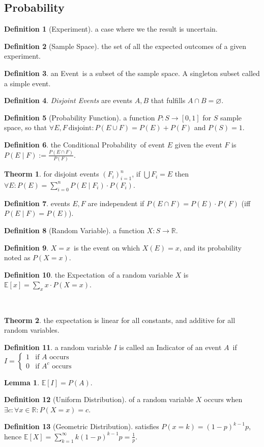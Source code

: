 \documentclass[]{article}
\newcommand\compactsection   [1]        {\vspace{-10pt}\section{#1}\vspace{-6pt}}
\theoremstyle{definition}
\newtheorem{Theorem}{\color{theoColor}Theorm}
\newtheorem{Definition}{\color{defiColor}Definition}
\newtheorem{Lemma}{\color{lemColor}Lemma}
\newcommand\theo  [1] {\begin{Theorem}#1\end{Theorem}}
\newcommand\defi  [1] {\begin{Definition}#1\end{Definition}}
\newcommand\lem   [1] {\begin{Lemma}#1\end{Lemma}}
\newcommand\R     {\mathbb{R}}
\newcommand\E     {\mathbb{E}}
\renewcommand\inf {\infty}
\newcommand\sumni     {\sum_{i = 0}^{n}}
\newcommand\co        {\colon}
\begin{document}
\begin{multicols}{4}
		\compactsection{Probability}
			\begin{Definition}[Experiment]
				a case where we the result is uncertain. 
			\end{Definition}
			\begin{Definition}[Sample Space]
				the set of all the expected outcomes of a given experiment. 
			\end{Definition}
			\defi{an \color{defiColor}Event\color{black}\, is a subset of the sample space. A singleton subset called a \color{defiColor}simple event\color{black}. }
			\defi{\textit{Disjoint Events} are events $A, B$ that fulfills $A \cap B = \varnothing$. }
			\begin{Definition}[Probability Function]
				a function $P \co S \to [0, 1]$ for $S$ sample space, so that $\forall E, F \ \text{disjoint} \co P(E \cup F) = P(E) + P(F)$ and $P(S) = 1$.
			\end{Definition}
			\defi{the \color{defiColor}Conditional Probability\color{black}\, of event $E$ given the event $F$ is $P(E \mid F) := \frac{P(E \cap F)}{P(F)}$. }
			\theo{for disjoint events $(F_i)_{i = 1}^{n}$, if $\bigcup F_i = E $ then $\forall E \co P(E) = \sumni P(E \mid F_i) \cdot P(F_i)$. }
			\defi{events $E, F$ are independent if $P(E \cap F) = P(E) \cdot P(F)$ (iff $P(E \mid F) = P(E)$). }
			\begin{Definition}[Random Variable]
				a function $X \co S \to \R$. 
			\end{Definition}
			\defi{\color{defiColor}$X = x$\color{black}\, is the event on which $X(E) = x$, and its probability noted as $P(X = x)$. }
			\defi{the \color{defiColor}Expectation\color{black}\, of a random variable $X$ is $\E[x] = \sum_{x} x \cdot P(X = x)$. }\
			\theo{the expectation is linear for all constants, and additive for all random variables. }
			\defi{a random variable $I$ is called an \color{defiColor}Indicator of an event $A$\color{black}\, if $I = \begin{cases}
					1 & \text{if $A$ occurs} \\
					0 & \text{if $A^c$ occurs}
				\end{cases}$}
			\lem{$\E[I] = P(A)$. }
			\begin{Definition}[Uniform Distribution]
					of a random variable $X$ occurs when $\exists c \co \forall x \in \R \co P(X = x) = c$. 
			\end{Definition}
			\begin{Definition}[Geometric Distribution]
					satisfies $P(x = k) = (1 - p)^{k - 1}p$, hence $\E[X] = \sum_{k = 1}^{\inf} k(1 - p)^{k - 1}p = \frac{1}{p}$. 

\end{Definition}
\end{multicols}
\end{document}
